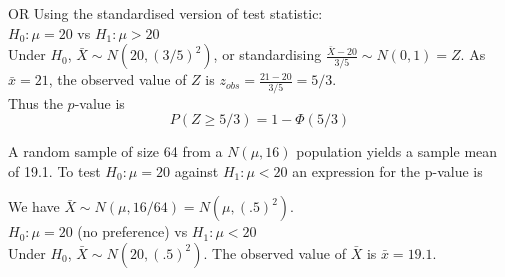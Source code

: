 \documentclass[bigtut]{tutorial}
\begin{document}
\begin{tutorial}
\begin{questions}
\begin{solution}
\vspace{1cm}
OR Using the standardised version of test statistic: \\


  $H_0: \mu=20$  vs $H_1: \mu > 20$ \\

  Under $H_0$, $\bar{X}  \sim N(20, (3/5)^2)$, or standardising 
$\frac{ \bar{X} - 20}{3/5} \sim N(0,1) = Z$. 
As $\bar{x}=21$, the observed value of  $Z$ is $z_{obs} = \frac{ 21 - 20}{3/5} = 5/3$.  \\

 Thus the $p$-value is 
\[ P(Z \geq 5/3) = 1-\Phi(5/3)  \]
\end{solution}



\question 
A random sample of size 64 from a $N(\mu,16)$ population
yields a sample mean of 19.1. To test $H_0\colon\mu=20$ against
$H_1\colon\mu<20$ an expression for the p-value is

\begin{solution}
  We have $\bar{X}  \sim N(\mu, 16/64)= N(\mu, (.5)^2)$.  \\

  $H_0: \mu=20$ (no preference) vs $H_1: \mu < 20$ \\

  Under $H_0$, $\bar{X}  \sim N(20, (.5)^2)$. 
The observed value of $\bar{X}$ is $\bar{x}=19.1$. \\


\end{solution}
\end{questions}
\end{tutorial}
\end{document}
